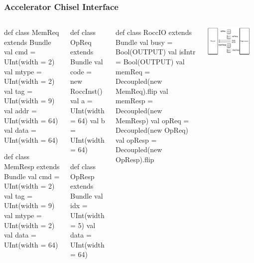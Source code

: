 \documentclass[xcolor=pdflatex,dvipsnames,table]{beamer}
\begin{document}
\begin{frame}[fragile]
\frametitle{Accelerator Chisel Interface}
\begin{columns}
{
\begin{scala}
def class MemReq extends Bundle {
  val cmd     = UInt(width = 2)
  val mtype   = UInt(width = 2)
  val tag     = UInt(width = 9)
  val addr    = UInt(width = 64)
  val data    = UInt(width = 64)
}

def class MemResp extends Bundle {
  val cmd     = UInt(width = 2)
  val tag     = UInt(width = 9)
  val mtype   = UInt(width = 2)
  val data    = UInt(width = 64)
}
\end{scala}
\begin{scala}
def class OpReq extends Bundle {
  val code = new RoccInst()
  val a    = UInt(width = 64)
  val b    = UInt(width = 64)
}

def class OpResp extends Bundle {
  val idx  = UInt(width = 5)
  val data = UInt(width = 64)
}
\end{scala}

}


{
\begin{scala}
def class RoccIO extends Bundle {
  val busy    = Bool(OUTPUT)
  val isIntr  = Bool(OUTPUT)
  val memReq  = Decoupled(new MemReq).flip
  val memResp = Decoupled(new MemResp)
  val opReq   = Decoupled(new OpReq)
  val opResp  = Decoupled(new OpResp).flip
}
\end{scala}
}
\begin{center}
\includegraphics[width=0.9\textwidth]{figs/rocket-coprocessor.pdf}
\end{center}

\end{columns}
\end{frame}
\end{document}
